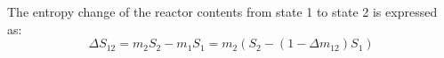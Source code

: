 The entropy change of the reactor contents from state 1 to state 2 is expressed as:  
\[
\Delta S_{12} = m_2 S_2 - m_1 S_1 = m_2 \left( S_2 - (1 - \Delta m_{12}) S_1 \right)
\]